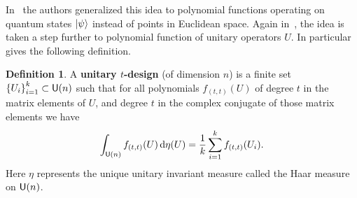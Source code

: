 \documentclass[11pt,english]{article}
\theoremstyle{definition}
\newtheorem{definition}{Definition}[section]
\begin{document}
In~\cite{state-designs} the authors generalized this idea to polynomial functions operating on quantum states $\ket{\psi}$ instead of points in Euclidean space.
Again in~\cite{exact-approx-designs}, the idea is taken a step further to polynomial function of unitary operators $U$.
In particular~\cite{exact-approx-designs} gives the following definition.
\begin{definition}
  A \textbf{unitary $t$-design} (of dimension $n$) is a finite set $\qty{U_i}_{i = 1}^k\subset\mathsf{U}(n)$ such that for all polynomials $f_{(t, t)}(U)$ of degree $t$ in the matrix elements of $U$, and degree $t$ in the complex conjugate of those matrix elements we have
  \begin{equation}
    \int_{\mathsf{U}(n)}f_{(t,t)}(U)\dd{\eta(U)} = \frac{1}{k}\sum_{i = 1}^k f_{(t,t)}(U_i).
  \end{equation}
  Here $\eta$ represents the unique unitary invariant measure called the Haar measure on $\mathsf{U}(n)$.
\end{definition}

\nocite{*}

\clearpage


\end{document}
